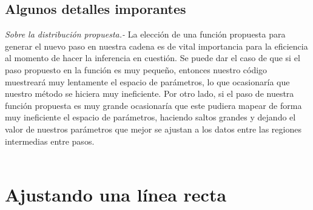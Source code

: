 \documentclass[10.5pt,prb,
               showpacs,            %
               preprintnumbers,     %
               aps,                 %
               prl,          	    %
               letterpaper,             %
               superscriptaddress,      %
               nofootinbib,         %
               tightenlines,        %
               floats,floatfix      %
               ,usenatbib]{revtex4-1}%
\begin{document}
\subsection{Algunos detalles imporantes}

\textit{Sobre la distribuci\'on propuesta.-} La elecci\'on de una funci\'on propuesta para generar el 
nuevo paso en nuestra cadena es de vital importancia para la eficiencia al momento de hacer la 
inferencia en cuesti\'on. Se puede dar el caso de que si el paso propuesto en la funci\'on es 
muy peque\~no, entonces nuestro c\'odigo muestrear\'a muy lentamente el espacio de par\'ametros, 
lo que ocasionar\'ia que nuestro m\'etodo se hiciera muy ineficiente. Por otro lado, si el paso de 
nuestra funci\'on propuesta es muy grande ocasionar\'ia que este pudiera mapear de forma muy 
ineficiente el espacio de par\'ametros, haciendo saltos grandes y dejando el valor de nuestros 
par\'ametros que mejor se ajustan a los datos entre las regiones intermedias entre pasos.
\\ $ $ 



\section{Ajustando una l\'inea recta}
\end{document}
